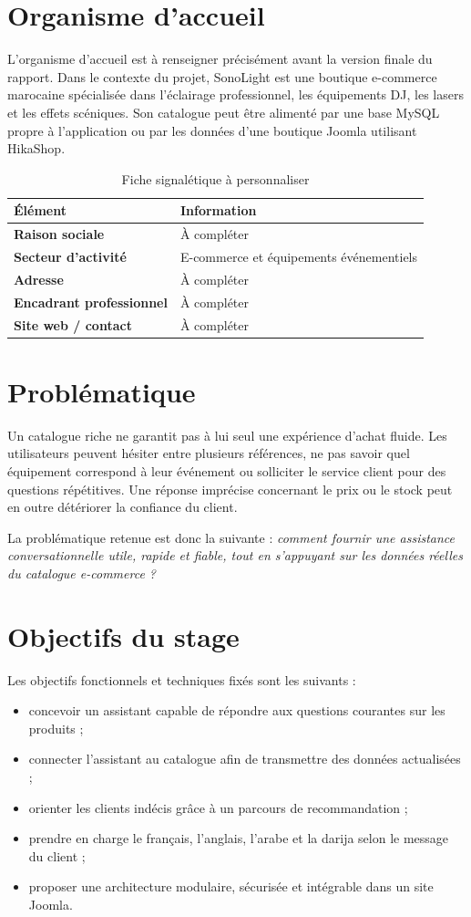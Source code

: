 \documentclass[12pt,a4paper,oneside]{report}
\begin{document}
\section{Organisme d'accueil}
L'organisme d'accueil est à renseigner précisément avant la version finale du rapport. Dans le contexte du projet, SonoLight est une boutique e-commerce marocaine spécialisée dans l'éclairage professionnel, les équipements DJ, les lasers et les effets scéniques. Son catalogue peut être alimenté par une base MySQL propre à l'application ou par les données d'une boutique Joomla utilisant HikaShop.

\begin{table}[H]
\centering
\caption{Fiche signalétique à personnaliser}
\begin{tabularx}{\textwidth}{>{\bfseries}l X}
\toprule
Élément & Information \\
\midrule
Raison sociale & À compléter \\
Secteur d'activité & E-commerce et équipements événementiels \\
Adresse & À compléter \\
Encadrant professionnel & À compléter \\
Site web / contact & À compléter \\
\bottomrule
\end{tabularx}
\end{table}

\section{Problématique}
Un catalogue riche ne garantit pas à lui seul une expérience d'achat fluide. Les utilisateurs peuvent hésiter entre plusieurs références, ne pas savoir quel équipement correspond à leur événement ou solliciter le service client pour des questions répétitives. Une réponse imprécise concernant le prix ou le stock peut en outre détériorer la confiance du client.

La problématique retenue est donc la suivante : \emph{comment fournir une assistance conversationnelle utile, rapide et fiable, tout en s'appuyant sur les données réelles du catalogue e-commerce ?}

\section{Objectifs du stage}
Les objectifs fonctionnels et techniques fixés sont les suivants :
\begin{itemize}
  \item concevoir un assistant capable de répondre aux questions courantes sur les produits ;
  \item connecter l'assistant au catalogue afin de transmettre des données actualisées ;
  \item orienter les clients indécis grâce à un parcours de recommandation ;
  \item prendre en charge le français, l'anglais, l'arabe et la darija selon le message du client ;
  \item proposer une architecture modulaire, sécurisée et intégrable dans un site Joomla.
\end{itemize}
\end{document}
